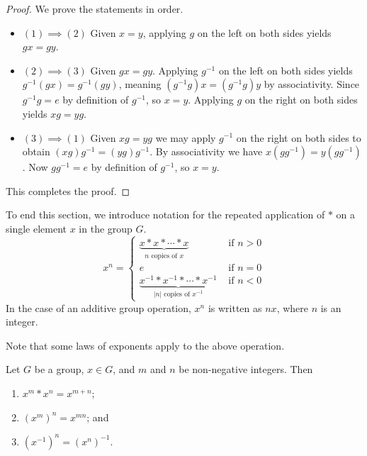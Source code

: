 \begin{proof}
    We prove the statements in order.
    \begin{itemize}
        \item $\boxed{(1) \implies (2)}$ Given $x = y$, applying $g$ on the left on both sides yields $gx = gy$.

        \item $\boxed{(2) \implies (3)}$ Given $gx = gy$. Applying
        $g^{-1}$ on the left on both sides yields $g^{-1}(gx) = g^{-1}(gy)$, meaning $(g^{-1}g)x = (g^{-1}g)y$ by associativity. Since $g^{-1}g = e$ by definition of $g^{-1}$, so $x = y$. Applying $g$ on the right on both sides yields $xg = yg$.

        \item $\boxed{(3) \implies (1)}$ Given $xg = yg$ we may apply $g^{-1}$ on the right on both sides to obtain $(xg)g^{-1} = (yg)g^{-1}$. By associativity we have $x(gg^{-1}) = y(gg^{-1})$. Now $gg^{-1} = e$ by definition of $g^{-1}$, so $x = y$.
    \end{itemize}
    This completes the proof.
\end{proof}

To end this section, we introduce notation for the repeated application of $\ast$ on a single element $x$ in the group $G$.
\[
    x^n =
    \begin{cases}
        \underbrace{x\ast x\ast \cdots \ast x}_{n \text{ copies of } x} & \text{ if } n > 0\\
        e & \text{ if } n=0 \\
        \underbrace{x^{-1}\ast x^{-1}\ast \cdots \ast x^{-1}}_{|n| \text{ copies of } x^{-1}} & \text{ if } n<0
    \end{cases}
\]
In the case of an additive group operation, $x^n$ is written as $nx$, where $n$ is an integer.

Note that some laws of exponents apply to the above operation.
\begin{proposition}\label{prop-group-laws-of-exponents}
    Let $G$ be a group, $x \in G$, and $m$ and $n$ be non-negative integers. Then
    \begin{enumerate}
        \item $x^m \ast x^n = x^{m+n}$;
        \item $\left(x^m\right)^n = x^{mn}$; and
        \item $\left(x^{-1}\right)^n = \left(x^n\right)^{-1}$.
    \end{enumerate}
\end{proposition}



